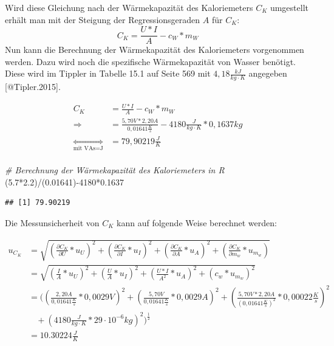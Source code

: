 \documentclass[class=article, crop=false]{standalone}
\newenvironment{Shaded}{\begin{snugshade}}{\end{snugshade}}
\newcommand{\CommentTok}[1]{\textcolor[rgb]{0.56,0.35,0.01}{\textit{#1}}}
\newcommand{\DecValTok}[1]{\textcolor[rgb]{0.00,0.00,0.81}{#1}}
\newcommand{\FloatTok}[1]{\textcolor[rgb]{0.00,0.00,0.81}{#1}}
\newcommand{\NormalTok}[1]{#1}
\newcommand{\SpecialCharTok}[1]{\textcolor[rgb]{0.00,0.00,0.00}{#1}}
\begin{document}
Wird diese Gleichung nach der Wärmekapazität des Kaloriemeters \(C_K\)
umgestellt erhält man mit der Steigung der Regressionsgeraden \(A\) für
\(C_K\): \[C_K = \frac{U*I}{A}-c_W*m_W\] Nun kann die Berechnung der
Wärmekapazität des Kaloriemeters vorgenommen werden. Dazu wird noch die
spezifische Wärmekapazität von Wasser benötigt. Diese wird im Tippler in
Tabelle 15.1 auf Seite 569 mit \(4,18 \frac{kJ}{kg\cdot K}\) angegeben
{[}@Tipler.2015{]}.

\begin{equation*}
\begin{split}
C_K &= \frac{U*I}{A}-c_W*m_W\\
\Rightarrow &=\frac{5,70V*2,20A}{0,01641\frac{K}{s}}-4180\frac{J}{kg\cdot K}*0,1637kg\\
\underset{\text{mit VAs=J}}{\Leftrightarrow} &= 79,90219\frac{J}{K}\\
\end{split}
\end{equation*}

\begin{Shaded}
\begin{Highlighting}[]
\CommentTok{\# Berechnung der Wärmekapazität des Kaloriemeters in R}
\NormalTok{(}\FloatTok{5.7}\SpecialCharTok{*}\FloatTok{2.2}\NormalTok{)}\SpecialCharTok{/}\NormalTok{(}\FloatTok{0.01641}\NormalTok{)}\SpecialCharTok{{-}}\DecValTok{4180}\SpecialCharTok{*}\FloatTok{0.1637}
\end{Highlighting}
\end{Shaded}

\begin{verbatim}
## [1] 79.90219
\end{verbatim}

Die Messunsicherheit von \(C_K\) kann auf folgende Weise berechnet
werden:

\begin{equation*}
\begin{split}
u_{C_K} &= \sqrt{(\frac{\partial C_K}{\partial U}*u_U)^2+(\frac{\partial C_K}{\partial I}*u_I)^2+(\frac{\partial C_K}{\partial A}*u_A)^2+(\frac{\partial C_K}{\partial m_w}*u_{m_w})}\\
&=\sqrt{(\frac{I}{A}*u_U)^2+(\frac{U}{A}*u_I)^2+(\frac{U*I}{A^2}*u_A)^2+(c_w*u_{m_w})^2}\\
&= ((\frac{2,20A}{0,01641\frac{K}{s}}*0,0029V)^2+(\frac{5,70V}{0,01641\frac{K}{s}}*0,0029A)^2+(\frac{5,70V*2,20A}{(0,01641\frac{K}{s})^2}*0,00022\frac{K}{s})^2\\
&\ \ \ \ +(4180\frac{J}{kg\cdot K}*29\cdot 10^{-6}kg)^2)^{\frac{1}{2}}\\
&= 10.30224 \frac{J}{K}
\end{split}
\end{equation*}
\end{document}
